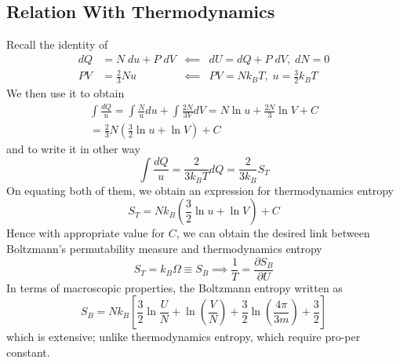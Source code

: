 \documentclass[../../../Main.tex]{subfiles}
\begin{document}
\subsection*{Relation With Thermodynamics}
Recall the identity of
\begin{align*}
    dQ&=N\;du+P\;dV&\impliedby &dU=dQ+P\;dV,\; dN=0\\
    PV&=\frac{2}{3}Nu&\impliedby &PV=Nk_BT,\;u=\frac{3}{2}k_BT
\end{align*}
We then use it to obtain
\begin{multline*}
    \int \frac{dQ}{u}=\int\frac{N}{u}du+\int \frac{2N}{3V}dV=N\ln u+\frac{2N}{3}\ln V+C\\
    =\frac{2}{3}N\left(\frac{3}{2}\ln u+\ln V\right)+C
\end{multline*}
and to write it in other way
\begin{equation*}
    \int \frac{dQ}{u}=\frac{2}{3k_BT}dQ=\frac{2}{3k_B}S_{T}
\end{equation*}
On equating both of them, we obtain an expression for thermodynamics entropy 
\begin{equation*}
    S_{T}=Nk_B\left(\frac{3}{2}\ln u+\ln V\right)+C
\end{equation*}
Hence with appropriate value for $C$, we can obtain the desired link between Boltzmann's permutability measure and thermodynamics entropy
\begin{equation*}
    S_T=k_B\Omega\equiv S_{B}\implies\frac{1}{T}=\frac{\partial S_B}{\partial U}
\end{equation*}
In terms of macroscopic properties, the Boltzmann entropy written as
\begin{equation*}
    S_B=Nk_B\left[\frac{3}{2}\ln \frac{U}{N}+\ln \left(\frac{V}{N}\right)+\frac{3}{2}\ln\left(\frac{4\pi}{3m}\right)+\frac{3}{2}\right]
\end{equation*}
which is extensive; unlike thermodynamics entropy, which require pro-per constant.
\end{document}
